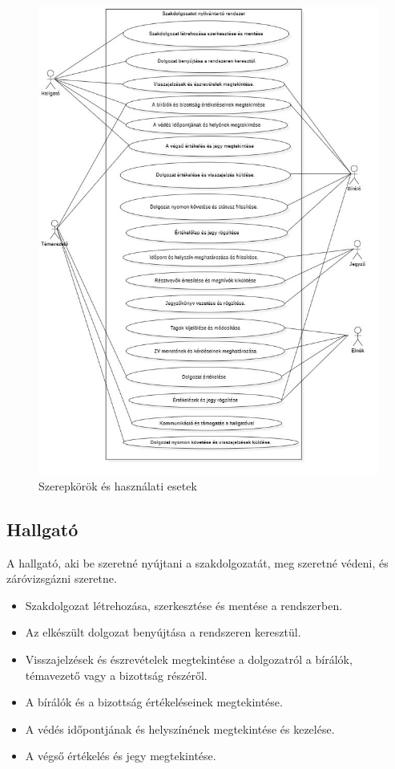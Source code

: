 \documentclass[a4paper,12pt]{article}
\begin{document}
\begin{figure}[h!]
	\centering
	\includegraphics[width=\textwidth]{images/Use-case_diagram/use-case_1.jpg}
	\caption{Szerepkörök és használati esetek}
	\label{fig:use-cases}
\end{figure}

\subsection{Hallgató}

A hallgató, aki be szeretné nyújtani a szakdolgozatát, meg szeretné védeni, és záróvizsgázni szeretne.
\begin{itemize}
\item Szakdolgozat létrehozása, szerkesztése és mentése a rendszerben.
\item Az elkészült dolgozat benyújtása a rendszeren keresztül.
\item Visszajelzések és észrevételek megtekintése a dolgozatról a bírálók, témavezető vagy a bizottság részéről.
\item A bírálók és a bizottság értékeléseinek megtekintése.
\item A védés időpontjának és helyszínének megtekintése és kezelése.
\item A végső értékelés és jegy megtekintése.
\end{itemize}
\end{document}
